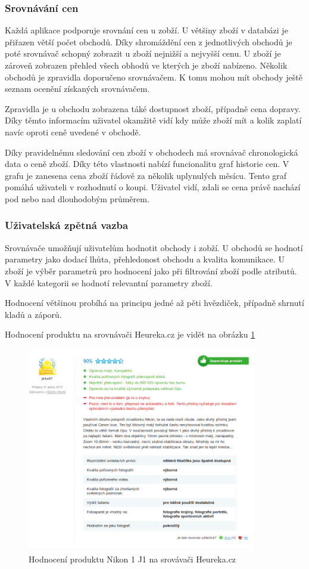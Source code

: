 \subsubsection{Srovnávání cen}
Každá aplikace podporuje srovnání cen u zobží. U většiny zboží v databázi je přiřazen větší počet obchodů. Díky shromáždění cen z jednotlivých obchodů je poté srovnávač schopný zobrazit u zboží nejnižší a nejvyšší cenu. U zboží je zároveň zobrazen přehled všech obhodů ve kterých je zboží nabízeno. Několik obchodů je zpravidla doporučeno srovnávačem. K tomu mohou mít obchody ještě seznam ocenění získaných srovnávačem.

Zpravidla je u obchodu zobrazena táké dostupnost zboží, případně cena dopravy. Díky těmto informacím uživatel okamžitě vidí kdy může zboží mít a kolik zaplatí navíc oproti ceně uvedené v obchodě.

Díky pravidelnému sledování cen zboží v obchodech má srovnávač chronologická data o ceně zboží. Díky této vlastnosti nabízí funcionalitu graf historie cen. V grafu je zanesena cena zboží řádově za několik uplynulých měsícu. Tento graf pomáhá uživateli v rozhodnutí o koupi. Uživatel vidí, zdali se cena právě nachází pod nebo nad dlouhodobým průměrem.

\subsubsection{Uživatelská zpětná vazba}
Srovnávače umožňují uživatelům hodnotit obchody i zobží. U obchodů se hodnotí parametry jako dodací lhůta, přehledonost obchodu a kvalita komunikace. U zboží je výběr parametrů pro hodnocení jako při filtrování zboží podle atributů. V každé kategorii se hodnotí relevantní parametry zboží. 

Hodnocení většinou probíhá na principu jedné až pěti hvězdiček, případně shrnutí kladů a záporů.

Hodnocení produktu na srovnávači Heureka.cz je vidět na obrázku \ref{fig:heureka-hodnoceni-produktu}

\begin{figure}[htb]
\begin{center}
\includegraphics[width=100mm]{./pictures/heureka-hodnoceni-produktu.png}
\caption{Hodnocení produktu Nikon 1 J1 na srovávači Heureka.cz}
\label{fig:heureka-hodnoceni-produktu}
\end{center}
\end{figure}

